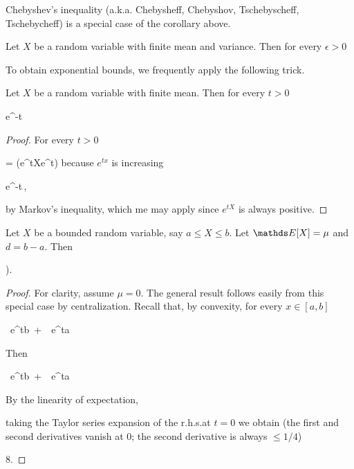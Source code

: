 \documentclass[scombinatorics.tex]{subfiles}
\begin{document}
Chebyshev's inequality (a.k.a. Chebysheff, Chebyshov, Tschebyscheff, Tschebycheff) is a special case of the corollary above.

\begin{void_thm}\label{Chebyshev}
    Let $X$ be a random variable with finite mean and variance.
    Then for every $\epsilon>0$
    
    {\le}
    {}\QED
\end{void_thm}

To obtain exponential bounds, we frequently apply the following trick.

\begin{void_thm}\label{lem_chernoff_method}
  Let $X$ be a random variable with finite mean.
  Then for every $t>0$

  {\le}
  {e^{-t\epsilon}\,\Ex\big[e^{tX}\big]}
\end{void_thm}

\begin{proof}
  For  every $t>0$

  {=}
  {\Pr\big(e^{tX}\ge e^{t\epsilon}\big)}
  \hfill because $e^{tx}$ is increasing
  
  \ceq{}
  {\le}
  {e^{-t\epsilon}\,\Ex\big[e^{tX}\big],}

  by Markov's inequality, which me may apply since $e^{tX}$ is always positive. 
\end{proof}


  \begin{void_thm}\label{lem_Hoeffding}
    Let $X$ be a bounded random variable, say $a\le X\le b$. 
    Let $\Ex[X]=\mu$ and $d=b-a$.
    Then
    
    \ceq{\hfill\Ex\Big[e^{t(X-\mu)}\Big]}
    {\le}
    {\Big).}\smallskip
  \end{void_thm}

\begin{proof}
  For clarity, assume $\mu=0$.
  The general result follows easily from this special case by centralization.
  Recall that, by convexity, for every $x\in[a,b]$

  {\le}
  {\ e^{tb}\ +\ \ e^{ta}}

  Then

  {\le}
  {\ e^{tb}\ +\ \ e^{ta}}

  By the linearity of expectation,

  \ceq{\hfill\Ex\Big[e^{tX}\Big]}
  {\le}
  {}

  \ceq{\hfill\log\Ex\Big[e^{tX}\Big]}
  {\le}
  {\log{}}

taking the Taylor series expansion of the r.h.s.\@ at $t=0$ we obtain (the first and second derivatives vanish at $0$; the second derivative is always $\le 1/4$)

\ceq{\hfill\log\Ex\Big[e^{tX}\Big]}
    {\le}
    {8.}
\end{proof}
\end{document}
